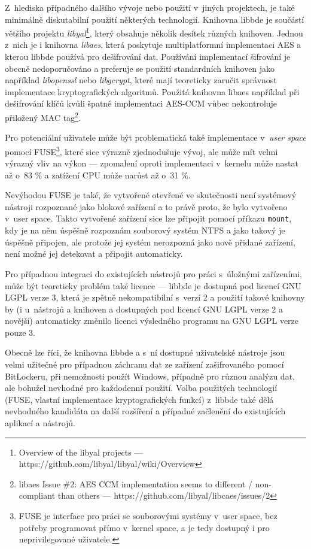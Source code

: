 Z~hlediska případného dalšího vývoje nebo použití v~jiných projektech, je také minimálně diskutabilní použití některých technologií. Knihovna libbde je součástí většího projektu \emph{libyal}\footnote{Overview of the libyal projects --- https://github.com/libyal/libyal/wiki/Overview}, který obsahuje několik desítek různých knihoven. Jednou z~nich je i knihovna \emph{libaes}, která poskytuje multiplatformní implementaci AES a kterou libbde používá pro dešifrování dat. Používání  implementací šifrování je obecně nedoporučováno a preferuje se použití standardních knihoven jako například \emph{libopenssl} nebo \emph{libgcrypt}, které mají teoreticky zaručit správnost implementace kryptografických algoritmů. Použitá knihovna libaes například při dešifrování klíčů kvůli špatné implementaci AES-CCM vůbec nekontroluje přiložený MAC tag\footnote{libaes Issue \#2: AES CCM implementation seems to different / non-compliant than others --- https://github.com/libyal/libcaes/issues/2}.

Pro potenciální uživatele může být problematická také implementace v~\emph{user space} pomocí FUSE\footnote{FUSE je interface pro práci se souborovými systémy v~user space, bez potřeby programovat přímo v~kernel space, a je tedy dostupný i pro neprivilegované uživatele\cite{Singh2014}.}, které sice výrazně zjednodušuje vývoj, ale může mít velmi výrazný vliv na výkon --- zpomalení oproti implementaci v~kernelu může nastat až o~83 \% a zatížení CPU může narůst až o~31 \%\cite{Vangoor2017}.

Nevýhodou FUSE je také, že vytvořené otevřené  ve skutečnosti není systémový nástroji rozpoznané jako blokové zařízení a to právě proto, že bylo vytvořeno v~user space. Takto vytvořené zařízení sice lze připojit pomocí příkazu \texttt{mount}, kdy je na něm úspěšně rozpoznám souborový systém NTFS a jako takový je úspěšně připojen, ale protože jej systém nerozpozná jako nově přidané zařízení, není možné jej detekovat a připojit automaticky.

Pro případnou integraci do existujících nástrojů pro práci s~úložnými zařízeními, může být teoreticky problém také licence --- libbde je dostupná pod licencí GNU LGPL verze 3, která je zpětně nekompatibilní s~verzí 2 a použití takové knihovny by (i u~nástrojů a knihoven a dostupných pod licencí GNU LGPL verze 2 a novější) automaticky změnilo licenci výsledného programu na GNU LGPL verze pouze 3\cite{GNU2019}.

Obecně lze říci, že knihovna libbde a s~ní dostupné uživatelské nástroje jsou velmi užitečné pro případnou záchranu dat ze zařízení zašifrovaného pomocí BitLockeru, při nemožnosti použít Windows, případně pro různou analýzu dat, ale bohužel nevhodné pro každodenní použití. Volba použitých technologií (FUSE, vlastní implementace kryptografických funkcí) z~libbde také dělá nevhodného kandidáta na další rozšíření a případné začlenění do existujících aplikací a nástrojů.

